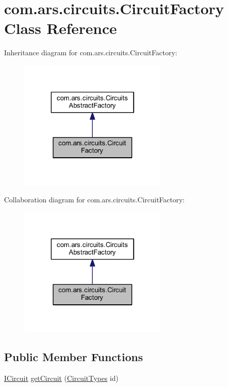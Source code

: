 \hypertarget{classcom_1_1ars_1_1circuits_1_1_circuit_factory}{}\section{com.\+ars.\+circuits.\+Circuit\+Factory Class Reference}
\label{classcom_1_1ars_1_1circuits_1_1_circuit_factory}


Inheritance diagram for com.\+ars.\+circuits.\+Circuit\+Factory\+:
\nopagebreak
\begin{figure}[H]
\begin{center}
\leavevmode
\includegraphics[width=202pt]{classcom_1_1ars_1_1circuits_1_1_circuit_factory__inherit__graph}
\end{center}
\end{figure}


Collaboration diagram for com.\+ars.\+circuits.\+Circuit\+Factory\+:
\nopagebreak
\begin{figure}[H]
\begin{center}
\leavevmode
\includegraphics[width=202pt]{classcom_1_1ars_1_1circuits_1_1_circuit_factory__coll__graph}
\end{center}
\end{figure}
\subsection*{Public Member Functions}
\begin{DoxyCompactItemize}
\item 
\hyperlink{interfacecom_1_1ars_1_1circuits_1_1_i_circuit}{I\+Circuit} \hyperlink{classcom_1_1ars_1_1circuits_1_1_circuit_factory_a0546784d697bdf29e7841c75bb98c8a8}{get\+Circuit} (\hyperlink{enumcom_1_1ars_1_1circuits_1_1_circuit_types}{Circuit\+Types} id)
\end{DoxyCompactItemize}


